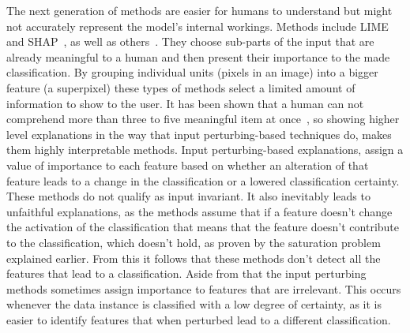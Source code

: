 The next generation of methods are easier for humans to understand but might not accurately represent the model's internal workings. Methods include LIME~\cite{Ribeiro0G16} and SHAP~\cite{LundbergL17}, as well as others~\cite{ElenbergDFK17, Ribeiro0G18}. They choose sub-parts of the input that are already meaningful to a human and then present their importance to the made classification. By grouping individual units (\eg pixels in an image) into a bigger feature (\eg a superpixel) these types of methods select a limited amount of information to show to the user. It has been shown that a human can not comprehend more than three to five meaningful item at once~\cite{cowan2001magical, starkey1995development, morris2018human}, so showing higher level explanations in the way that input perturbing-based techniques do, makes them highly interpretable methods. Input perturbing-based explanations, assign a value of importance to each feature based on whether an alteration of that feature leads to a change in the classification or a lowered classification certainty. These methods do not qualify as input invariant. It also inevitably leads to unfaithful explanations, as the methods assume that if a feature doesn't change the activation of the classification that means that the feature doesn't contribute to the classification, which doesn't hold, as proven by the saturation problem explained earlier. From this it follows that these methods don't detect all the features that lead to a classification. Aside from that the input perturbing methods sometimes assign importance to features that are irrelevant. This occurs whenever the data instance is classified with a low degree of certainty, as it is easier to identify features that when perturbed lead to a different classification. 


